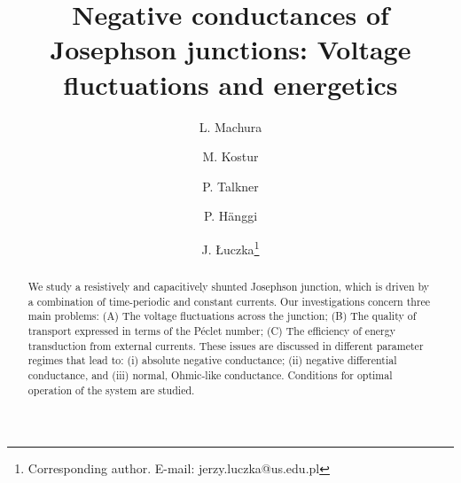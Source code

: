 \documentclass[a4,twocolumn,showpacs,showkeys]{revtex4}
\begin{document}
 





\title{Negative conductances of  Josephson junctions:  Voltage fluctuations and energetics} 

\author{L. Machura}

\author{M.  Kostur}

\author{P. Talkner}
%
\author{P. H\"anggi}

\author{J. \L uczka\footnote{Corresponding author. E-mail: jerzy.luczka@us.edu.pl }}




\begin{abstract}
We study a resistively and capacitively 
shunted Josephson junction,
which is driven by a combination of time-periodic and constant
currents.  Our investigations concern three main problems: (A) The voltage
fluctuations across the junction;  (B) The quality of transport expressed in terms of the P\'eclet number;   (C) The efficiency of energy transduction  
from external  currents. These issues are discussed in different
parameter regimes that lead to: (i) absolute negative
conductance; (ii) negative differential
conductance, and (iii) normal, Ohmic-like conductance.  Conditions for optimal operation 
of the system are studied. 

\end{abstract}





\maketitle
\end{document}
